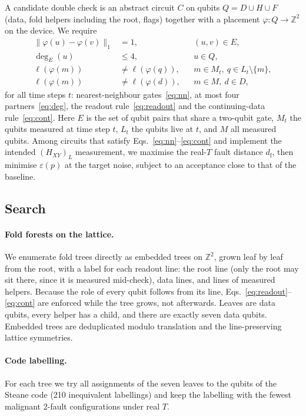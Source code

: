 \documentclass[aps,pra,reprint,superscriptaddress,longbibliography]{revtex4-2}
\newcommand{\HXY}{H_{XY}}
\newcommand{\df}{d_{\mathrm{f}}}
\begin{document}
A candidate double check is an abstract circuit $C$ on qubits $Q=D\cup H\cup F$ (data, fold helpers including the root, flags) together with a placement $\varphi:Q\to\mathbb{Z}^2$ on the device.
We require
\begin{align}
\lVert\varphi(u)-\varphi(v)\rVert_1 &= 1, && (u,v)\in E, \label{eq:nn}\\
\deg_E(u) &\le 4, && u\in Q, \label{eq:deg}\\
\ell(\varphi(m)) &\ne \ell(\varphi(q)), && m\in M_t,\ q\in L_t\setminus\{m\}, \label{eq:readout}\\
\ell(\varphi(m)) &\ne \ell(\varphi(d)), && m\in M,\ d\in D, \label{eq:cont}
\end{align}
for all time steps $t$: nearest-neighbour gates~\eqref{eq:nn}, at most four partners~\eqref{eq:deg}, the readout rule~\eqref{eq:readout} and the continuing-data rule~\eqref{eq:cont}.
Here $E$ is the set of qubit pairs that share a two-qubit gate, $M_t$ the qubits measured at time step $t$, $L_t$ the qubits live at $t$, and $M$ all measured qubits.
Among circuits that satisfy Eqs.~\eqref{eq:nn}--\eqref{eq:cont} and implement the intended $(\HXY)_L$ measurement, we maximise the real-$T$ fault distance $\df$, then minimise $\varepsilon(p)$ at the target noise, subject to an acceptance close to that of the baseline.

\subsection{Search}

\paragraph{Fold forests on the lattice.}
We enumerate fold trees directly as embedded trees on $\mathbb{Z}^2$, grown leaf by leaf from the root, with a label for each readout line: the root line (only the root may sit there, since it is measured mid-check), data lines, and lines of measured helpers.
Because the role of every qubit follows from its line, Eqs.~\eqref{eq:readout}--\eqref{eq:cont} are enforced while the tree grows, not afterwards.
Leaves are data qubits, every helper has a child, and there are exactly seven data qubits.
Embedded trees are deduplicated modulo translation and the line-preserving lattice symmetries.

\paragraph{Code labelling.}
For each tree we try all assignments of the seven leaves to the qubits of the Steane code (210 inequivalent labellings) and keep the labelling with the fewest malignant 2-fault configurations under real $T$.
\end{document}
